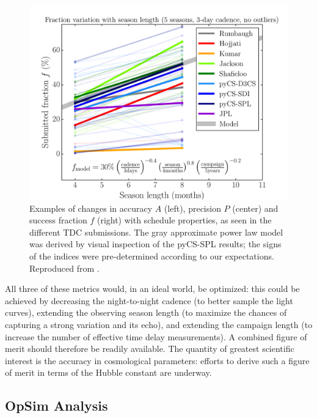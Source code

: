 \begin{figure}[!ht]
\begin{minipage}[b]{\linewidth}
\begin{minipage}[b]{0.32\linewidth}
      \centering\includegraphics[width=\linewidth]{figs/Fraction_season_nca.pdf}
    \end{minipage}
  \end{minipage}
\caption{Examples of changes in accuracy $A$ (left), precision $P$ (center) and success fraction $f$ (right) with schedule properties, as seen in the different TDC submissions. The gray
approximate power law model was derived by visual inspection of the
pyCS-SPL results; the signs of the indices were pre-determined according to our expectations. Reproduced from \citet{LiaoEtal2015}.}
\label{fig:tdcresults}
\end{figure}

All three of these metrics would, in an ideal world, be optimized:
this could be achieved by decreasing the night-to-night cadence (to
better sample the light curves), extending the observing season length
(to maximize the chances of capturing a strong variation and its
echo), and extending the campaign length (to increase the number of
effective time delay measurements). A combined figure of merit should
therefore be readily available. The quantity of greatest scientific
interest is the accuracy in cosmological parameters: efforts to derive
such a figure of merit in terms of the Hubble constant are underway.


\subsection{OpSim Analysis}
\label{sec:lenstimedelays:analysis}

